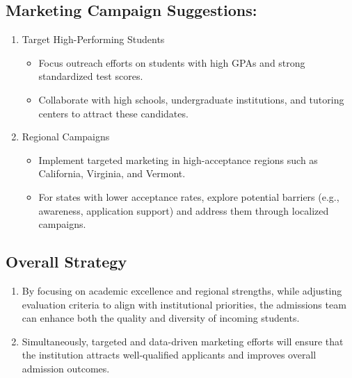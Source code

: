 \documentclass[
  letterpaper,
  DIV=11,
  numbers=noendperiod]{scrartcl}
\providecommand{\tightlist}{%
  \setlength{\itemsep}{0pt}\setlength{\parskip}{0pt}}\usepackage{longtable,booktabs,array}
\begin{document}
\subsection{Marketing Campaign
Suggestions:}\label{marketing-campaign-suggestions}

\begin{enumerate}
\def\labelenumi{\arabic{enumi}.}
\tightlist
\item
  Target High-Performing Students

  \begin{itemize}
  \tightlist
  \item
    Focus outreach efforts on students with high GPAs and strong
    standardized test scores.
  \item
    Collaborate with high schools, undergraduate institutions, and
    tutoring centers to attract these candidates.
  \end{itemize}
\item
  Regional Campaigns

  \begin{itemize}
  \tightlist
  \item
    Implement targeted marketing in high-acceptance regions such as
    California, Virginia, and Vermont.
  \item
    For states with lower acceptance rates, explore potential barriers
    (e.g., awareness, application support) and address them through
    localized campaigns.
  \end{itemize}
\end{enumerate}

\subsection{Overall Strategy}\label{overall-strategy}

\begin{enumerate}
\def\labelenumi{\arabic{enumi}.}
\tightlist
\item
  By focusing on academic excellence and regional strengths, while
  adjusting evaluation criteria to align with institutional priorities,
  the admissions team can enhance both the quality and diversity of
  incoming students.
\item
  Simultaneously, targeted and data-driven marketing efforts will ensure
  that the institution attracts well-qualified applicants and improves
  overall admission outcomes.
\end{enumerate}
\end{document}
